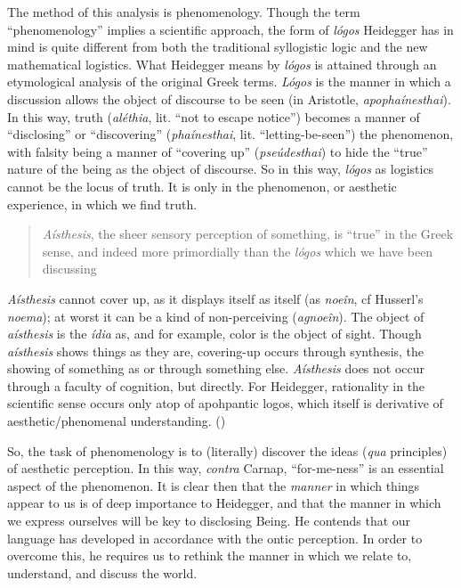 \documentclass[leqno, 12pt]{turabian-researchpaper}
\begin{document}
	The method of this analysis is phenomenology. Though the term \enquote{phenomenology}
	implies a scientific approach, the form of \textit{l\'ogos} Heidegger has in
	mind is quite different from both the traditional syllogistic logic and the
	new mathematical logistics. What Heidegger means by \textit{l\'ogos} is
	attained through an etymological analysis of the original Greek terms. \textit{L\'ogos}
	is the manner in which a discussion allows the object of discourse to be seen
	(in Aristotle, \textit{apopha\'inesthai}). In this way, truth (\textit{al\'ethia},
	lit. \enquote{not to escape notice}) becomes a manner of \enquote{disclosing} or
	\enquote{discovering} (\textit{pha\'inesthai}, lit. \enquote{letting-be-seen})
	the phenomenon, with falsity being a manner of \enquote{covering up} (\textit{pse\'udesthai})
	to hide the \enquote{true} nature of the being as the object of discourse. So in
	this way, \textit{l\'ogos} as logistics cannot be the locus of truth. It is
	only in the phenomenon, or aesthetic experience, in which we find truth. \blockquote[{}]
	{\textit{A\'isthesis}, %
	the sheer sensory perception of something, is \enquote{true} in the Greek sense, and indeed %
	more primordially than the \textit{l\'ogos} which we have been discussing}. \textit{A\'isthesis}
	cannot cover up, as it displays itself as itself (as \textit{noe\^in}, cf
	Husserl's \textit{noema}); at worst it can be a kind of non-perceiving (\textit{agnoe\^in}).
	The object of \textit{a\'isthesis} is the \textit{\'idia} as, and for example,
	color is the object of sight. Though \textit{a\'isthesis} shows things as they
	are, covering-up occurs through synthesis, the showing of something as or through
	something else. \textit{A\'isthesis} does not occur through a faculty of cognition,
	but directly. For Heidegger, rationality in the scientific sense occurs only
	atop of apohpantic logos, which itself is derivative of aesthetic/phenomenal understanding.
	()

	So, the task of phenomenology is to (literally) discover the ideas (\textit{qua}
	principles) of aesthetic perception. In this way, \textit{contra} Carnap, \enquote{for-me-ness}
	is an essential aspect of the phenomenon. It is clear then that the \textit{manner}
	in which things appear to us is of deep importance to Heidegger, and that the manner
	in which we express ourselves will be key to disclosing Being. He contends
	that our language has developed in accordance with the ontic perception. In order
	to overcome this, he requires us to rethink the manner in which we relate to, understand,
	and discuss the world.
\end{document}
